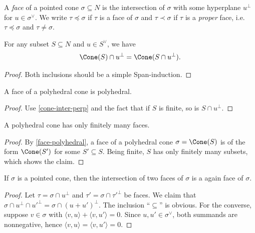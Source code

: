 \begin{definition}
  \label{face}
  A \emph{face} of a pointed cone \( \sigma \subseteq N \) is the
  intersection of \( \sigma \) with some hyperplane \( u^{\perp} \)
  for \( u \in \sigma^{\vee} \). We write \( \tau \preceq \sigma \) if
  \( \tau \) is a face of \( \sigma \) and \( \tau \prec \sigma \) if
  \( \tau \) is a \emph{proper} face, i.e. \( \tau \preceq \sigma \)
  and \( \tau \neq \sigma \).
\end{definition}

\begin{proposition}
  \label{cone-inter-perp}
  For any subset \( S \subseteq N \) and \( u \in S^{\vee} \), we have
  \[
      \Cone(S) \cap u^{\perp} = \Cone(S \cap u^{\perp}).
  \]
\end{proposition}
\begin{proof}
    Both inclusions should be a simple Span-induction.
\end{proof}

\begin{lemma}
  \label{face-polyhedral}
  A face of a polyhedral cone is polyhedral.
\end{lemma}
\begin{proof}
  Use \ref{cone-inter-perp} and the fact that if \( S \) is finite,
  so is \( S \cap u^{\perp} \).
\end{proof}



\begin{lemma}
  \label{faces-polyhedral-cone-finite}
  A polyhedral cone has only finitely many faces.
\end{lemma}
\begin{proof}
  \uses{}
  By \ref{face-polyhedral}, a face of a polyhedral cone \( \sigma =
  \Cone(S) \) is of the form \( \Cone(S') \) for some \( S' \subseteq
  S \). Being finite, \( S \) has only finitely many subsets, which
  shows the claim.
\end{proof}


\begin{lemma}
  \label{face-intersection}
  If \( \sigma \) is a pointed cone, then the intersection of two
  faces of \( \sigma \) is a again face of \( \sigma \).
\end{lemma}
\begin{proof}
  \uses{}
  Let \( \tau = \sigma \cap u^{\perp} \) and \( \tau' = \sigma \cap
  \tau'^{\perp} \) be faces. We claim that \( \sigma \cap u^{\perp}
  \cap u'^{\perp} = \sigma \cap (u + u')^{\perp} \). The inclusion
  ``\( \subseteq \)'' is obvious. For the converse, suppose \( v \in
  \sigma \) with \( \langle v, u \rangle + \langle v, u' \rangle = 0
  \). Since \( u, u' \in \sigma^{\vee} \), both summands are
  nonnegative, hence \( \langle v, u \rangle = \langle v, u' \rangle =
  0 \).
\end{proof}

